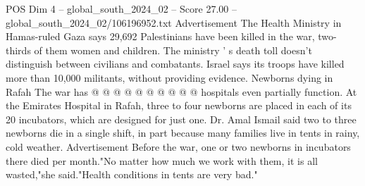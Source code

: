 \begin{textsample}{POS Dim 4 – global\_south\_2024\_02 – Score 27.00 – global\_south\_2024\_02/106196952.txt}
Advertisement The Health Ministry in Hamas-ruled Gaza says 29,692 Palestinians have been killed in the war, two-thirds of them women and children.
The ministry ' s death toll doesn't distinguish between civilians and combatants.
Israel says its troops have killed more than 10,000 militants, without providing evidence.
Newborns dying in Rafah The war has @ @ @ @ @ @ @ @ @ @ hospitals even partially function.
At the Emirates Hospital in Rafah, three to four newborns are placed in each of its 20 incubators, which are designed for just one.
Dr.
Amal Ismail said two to three newborns die in a single shift, in part because many families live in tents in rainy, cold weather.
Advertisement Before the war, one or two newborns in incubators there died per month."No matter how much we work with them, it is all wasted,"she said."Health conditions in tents are very bad."

\end{textsample}
